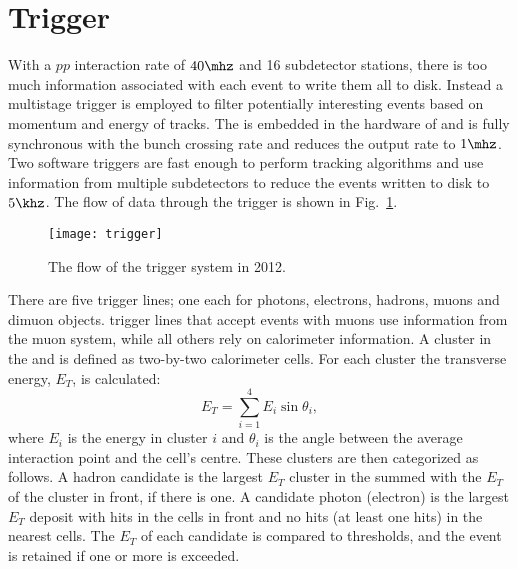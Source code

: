 \section{Trigger}
\label{sec:lhcb:trig}

With a $pp$ interaction rate of $40\mhz$ and 16 subdetector stations, there is too much information
associated with each event to write them all to disk.
Instead a multistage trigger is employed to filter potentially interesting events based on momentum
and energy of tracks.
The \lone is embedded in the hardware of \lhcb and is fully synchronous with
the bunch crossing rate and reduces the output rate to $1\mhz$.
Two software triggers are fast enough to perform tracking algorithms and use information from
multiple subdetectors to reduce the events written to disk to $5\khz$.
The flow of data through the trigger is shown in Fig.~\ref{fig:lhcb:trigger}.

\begin{figure}
  \begin{center}
    \texttt{[image: trigger]}
  \end{center}
  \caption[LHCb trigger sequence in 2012]
  {\small
    The flow of the \lhcb trigger system in 2012.
  }
  \label{fig:lhcb:trigger}
\end{figure}

There are five \lone trigger lines; one each for photons, electrons, hadrons, muons and dimuon
objects.
\lone trigger lines that accept events with muons use information from the muon system, while all
others rely on calorimeter information.
A cluster in the \ecal and \hcal is defined as two-by-two calorimeter cells.
For each cluster the transverse energy, $E_T$, is calculated:
\begin{equation}
  E_T = \sum_{i=1}^4E_i\sin\theta_i,
\end{equation}
where $E_i$ is the energy in cluster $i$ and $\theta_i$ is the angle between the average
interaction point and the cell's centre.
These clusters are then categorized as follows.
A hadron candidate is the largest $E_T$ cluster in the \hcal summed with the $E_T$ of the \ecal
cluster in front, if there is one.
A candidate photon (electron) is the largest $E_T$ deposit with hits in the \presh cells in front and
no hits (at least one hits) in the nearest \spd cells.
The $E_T$ of each candidate is compared to thresholds, and the event is retained if one or more is
exceeded.

